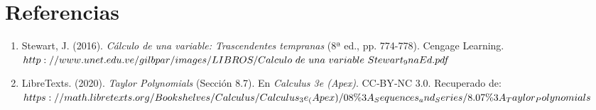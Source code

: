 \documentclass{article}
\begin{document}
\section{Referencias}
\begin{enumerate}
\item Stewart, J. (2016). \textit{Cálculo de una variable: Trascendentes tempranas} (8ª ed., pp. 774-778). Cengage Learning. $http://www.unet.edu.ve/gilbpar/images/LIBROS/Calculo\ de\ una\ variable\\\ Stewart_9naEd.pdf$
\item LibreTexts. (2020). \textit{Taylor Polynomials} (Sección 8.7). En \textit{Calculus 3e (Apex)}. CC‑BY‑NC 3.0. Recuperado de: $https://math.libretexts.org/Bookshelves/Calculus/Calculus_3e_(Apex)/08\%3\\A_Sequences_and_Series/8.07\%3A_Taylor_Polynomials$

\end{enumerate}
\end{document}
